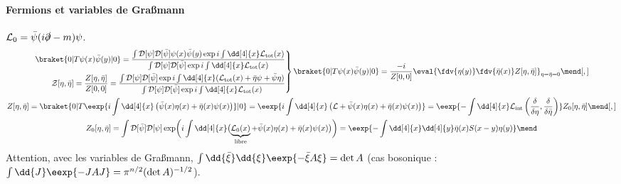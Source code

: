 \documentclass{article}
\begin{document}
\paragraph{Fermions et variables de Gra\ss mann} $\mathcal{L}_0 = \bar{\psi}(i\slashed{\partial}-m)\psi$.
\begin{gather*}
\left.
\begin{aligned}
\braket{0|T\psi(x)\bar{\psi}(y)|0} = \frac{\int\mathcal{D}[\psi]\mathcal{D}[\bar{\psi}]\psi(x)\bar{\psi}(y)\exp{i\int\dd[4]{x}\mathcal{L}_\text{tot}(x)}}{\int\mathcal{D}[\psi]\mathcal{D}[\bar{\psi}]\exp{i\int\dd[4]{x}\mathcal{L}_\text{tot}(x)}}\\
\mathcal{Z}[\eta,\bar{\eta}]
= \frac{Z[\eta,\bar{\eta}]}{Z[0,0]}
= \frac{\int\mathcal{D}[\psi]\mathcal{D}[\bar{\psi}]\exp{i\int\dd[4]{x}(\mathcal{L}_\text{tot}(x)+ \bar{\eta}\psi+\bar{\psi}\eta )}}{\int\mathcal{D}[\psi]\mathcal{D}[\bar{\psi}]\exp{i\int\dd[4]{x}\mathcal{L}_\text{tot}(x)}}
\end{aligned}
\right\rbrace
\braket{0|T\psi(x)\bar{\psi}(y)|0}
=
\frac{-i}{Z[0,0]} \eval{ \fdv{\eta(y)}\fdv{\bar{\eta}(x)} Z[\eta,\bar{\eta}]}_{\eta=\bar{\eta}=0}
\mend[,]\\
Z[\eta,\bar{\eta}]
= \braket{0|T\eexp{i\int\dd[4]{x}\left( \bar{\psi}(x)\eta(x) + \bar{\eta}(x)\psi(x) \right)}|0}
= \eexp{i\int\dd[4]{x}\left(\mathcal{L} + \bar{\psi}(x)\eta(x) + \bar{\eta}(x)\psi(x) \right)}
= \eexp{-\int \dd[4]{x} \mathcal{L}_\text{int}\left(\frac{\delta}{\delta \eta},\frac{\delta}{\delta \bar{\eta}}\right)}Z_0[\eta,\bar{\eta}]
\mend[,]\\
Z_0[\eta,\bar{\eta}]
= \int\mathcal{D}[\bar{\psi}]\mathcal{D}[\psi]\exp \biggl( i\int\dd[4]{x} \bigl( \underbrace{\mathcal{L}_0(x)}_\text{libre}+\bar{\psi}(x)\eta(x) + \bar{\eta}(x)\psi(x) \bigr) \biggr)
= \eexp{- \int\dd[4]{x}\dd[4]{y} \bar{\eta}(x)S(x-y)\eta(y) }
\mend
\end{gather*}
Attention, avec les variables de Gra\ss mann,
$ \int \dd{\bar{\xi}}\dd{\xi} \eexp{-\bar{\xi}A\xi} = \det A $ (cas bosonique : $\int \dd{J} \eexp{-JAJ} = \pi^{n/2}(\det A)^{-1/2}$).
\end{document}
